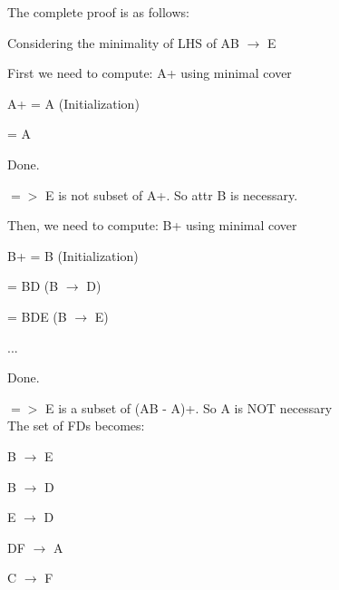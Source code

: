 \begin{enumerate}
\begin{enumerate}
\begin{enumerate}
                The complete proof is as follows:
               
				\hspace{0.2 in} Considering the minimality of LHS of AB  $\rightarrow$ E
				
				\hspace{0.2 in} First we need to compute: A+ using minimal cover
				
				\hspace{0.2 in} A+ = A (Initialization)
				
				\hspace{0.2 in} = A
				
				\hspace{0.2 in} Done.
				
				\hspace{0.2 in} $=>$ E is not subset of A+. So attr B is necessary.		
						
				\hspace{0.2 in} Then, we need to compute: B+ using minimal cover
				
				\hspace{0.2 in} B+ = B (Initialization)
				
				\hspace{0.2 in} = BD (B  $\rightarrow$ D)
				
				\hspace{0.2 in} = BDE (B  $\rightarrow$ E)
				
				\hspace{0.2 in} ...
				
				\hspace{0.2 in} Done.
				
				\hspace{0.2 in} $=>$ E is a subset of (AB - A)+. So A is NOT necessary\\

                The set of FDs becomes:
                
                \hspace{0.5 in} B $\rightarrow$ E

                \hspace{0.5 in} B $\rightarrow$ D
                
			    \hspace{0.5 in} E $\rightarrow$ D			

				\hspace{0.5 in} DF $\rightarrow$ A			

			 	\hspace{0.5 in} C $\rightarrow$ F			


\end{enumerate}
\end{enumerate}
\end{enumerate}
